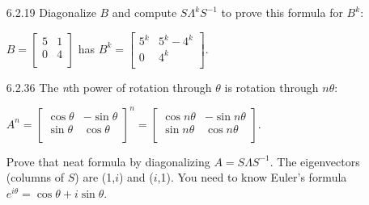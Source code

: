 \documentclass[10pt,twoside,reqno]{article}
\begin{document}
\begin{enumerate}
\vspace{3mm}
\item[6.2.19] Diagonalize $B$ and compute $S \Lambda^k S^{-1}$ to prove this formula for $B^k$: \\
\begin{center}
$
B=
\begin{bmatrix}
5&1\\
0&4\\
\end{bmatrix}
$
\hspace{8mm} has \hspace{8mm}
$
B^k=
\begin{bmatrix}
5^k&5^k-4^k\\
0&4^k\\
\end{bmatrix}
$. \\
\end{center}
\vspace{2mm}


\vspace{3mm}
\item[6.2.36] The \textit{n}th power of rotation through $\theta$ is rotation through $n \theta$: \\ 
\begin{center}
$
A^n=
\begin{bmatrix}
\cos\theta&-\sin\theta\\
\sin\theta&\cos\theta\\
\end{bmatrix}^n
=
\begin{bmatrix}
\cos n\theta&-\sin n\theta\\
\sin n\theta&\cos n\theta\\
\end{bmatrix}
$. \\
\end{center}
Prove that neat formula by diagonalizing $A=S \Lambda S^{-1}$. The eigenvectors (columns of $S$) are (1,$i$) and ($i$,1). You need to know Euler's formula $e^{i\theta}=\cos\theta+i\sin\theta$.
\vspace{2mm}


\vspace{3mm}
\end{enumerate}
\end{document}
